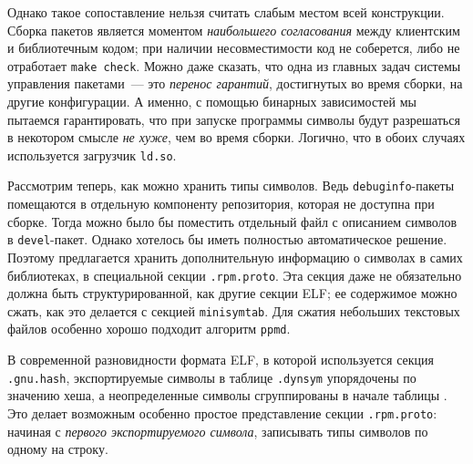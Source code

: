 \documentclass[russian,a4paper,12pt]{article}
\begin{document}
Однако такое сопоставление нельзя считать слабым местом всей конструкции.  Сборка
пакетов является моментом \textit{наибольшего согласования} между клиентским и библиотечным
кодом; при наличии несовместимости код не соберется, либо не отработает \texttt{make check}.
Можно даже сказать, что одна из главных задач системы управления пакетами~--- это
\emph{перенос гарантий}, достигнутых во время сборки, на другие конфигурации.
А именно, с помощью бинарных зависимостей мы пытаемся гарантировать, что
при запуске программы символы будут разрешаться в некотором смысле
\emph{не хуже}, чем во время сборки.  Логично, что в обоих случаях используется
загрузчик \verb|ld.so|.
\begin{comment}
Вообще само понятие бинарной совместимости следовало бы определить прежде всего
исходя из этих терминов.  Если так подумать, то никакой другой бинарной совместимости
просто больше и нету.  Ну если не брать совсем какие-нибудь высоколобые определения
про семантику и т.п.  А если брать попроще, то вот сразу после сборки программа
у нас работала.  И мы пытаемся "удержать" вокруг этой программы какие-то свойства
сборочной среды, чтобы она и дальше работала.  А если программа перестает работать,
то значит все, совместимость удержать не удалось, упустили мы бабу, то есть жарптицу
всмысле.  Птицу счастья завтрашнего дня.  Сегодня программа работает, а завтра она глючит.
Поль Мориа, любовь ушла.
\end{comment}

Рассмотрим теперь, как можно хранить типы символов.  Ведь \verb|debuginfo|-пакеты
помещаются в отдельную компоненту репозитория, которая не доступна при сборке.
Тогда можно было бы поместить отдельный файл с описанием символов в \verb|devel|-пакет.
Однако хотелось бы иметь полностью автоматическое решение.  Поэтому предлагается
хранить дополнительную информацию о символах в самих библиотеках, в специальной
секции \verb|.rpm.proto|.  Эта секция даже не обязательно должна быть структурированной,
как другие секции ELF; ее содержимое можно сжать, как это делается с секцией \verb|minisymtab|.
Для сжатия небольших текстовых файлов особенно хорошо подходит алгоритм \verb|ppmd|.

В современной разновидности формата ELF, в которой используется секция \verb|.gnu.hash|,
экспортируемые символы в таблице \verb|.dynsym| упорядочены по значению хеша,
а неопределенные символы сгруппированы в начале таблицы \cite[с.\,9]{dsohowto}.
Это делает возможным особенно простое представление секции \verb|.rpm.proto|:
начиная с \textit{первого экспортируемого символа}, записывать типы символов по одному на строку.
\end{document}
